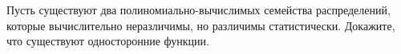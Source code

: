 Пусть существуют два полиномиально-вычислимых семейства распределений, которые вычислительно неразличимы,
но различимы статистически. Докажите, что существуют односторонние функции.
